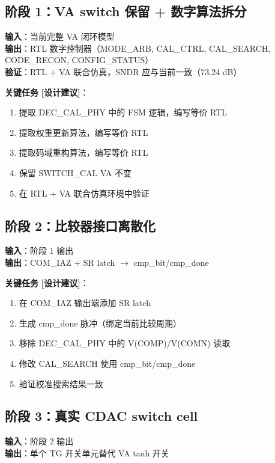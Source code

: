 \documentclass[UTF8,a4paper,11pt]{ctexart}
\newcommand{\suggested}{\textcolor{suggestblue}{\textbf{[设计建议]}}}
\begin{document}
\subsection{阶段 1：VA switch 保留 + 数字算法拆分}

\textbf{输入}：当前完整 VA 闭环模型\\
\textbf{输出}：RTL 数字控制器（MODE\_ARB, CAL\_CTRL, CAL\_SEARCH, CODE\_RECON, CONFIG\_STATUS）\\
\textbf{验证}：RTL + VA 联合仿真，SNDR 应与当前一致（73.24 dB）

\textbf{关键任务} \suggested：
\begin{enumerate}[leftmargin=2em]
\item 提取 DEC\_CAL\_PHY 中的 FSM 逻辑，编写等价 RTL
\item 提取权重更新算法，编写等价 RTL
\item 提取码域重构算法，编写等价 RTL
\item 保留 SWITCH\_CAL VA 不变
\item 在 RTL + VA 联合仿真环境中验证
\end{enumerate}

\subsection{阶段 2：比较器接口离散化}

\textbf{输入}：阶段 1 输出\\
\textbf{输出}：COM\_IAZ + SR latch $\rightarrow$ cmp\_bit/cmp\_done

\textbf{关键任务} \suggested：
\begin{enumerate}[leftmargin=2em]
\item 在 COM\_IAZ 输出端添加 SR latch
\item 生成 cmp\_done 脉冲（绑定当前比较周期）
\item 移除 DEC\_CAL\_PHY 中的 V(COMP)/V(COMN) 读取
\item 修改 CAL\_SEARCH 使用 cmp\_bit/cmp\_done
\item 验证校准搜索结果一致
\end{enumerate}

\subsection{阶段 3：真实 CDAC switch cell}

\textbf{输入}：阶段 2 输出\\
\textbf{输出}：单个 TG 开关单元替代 VA tanh 开关
\end{document}
